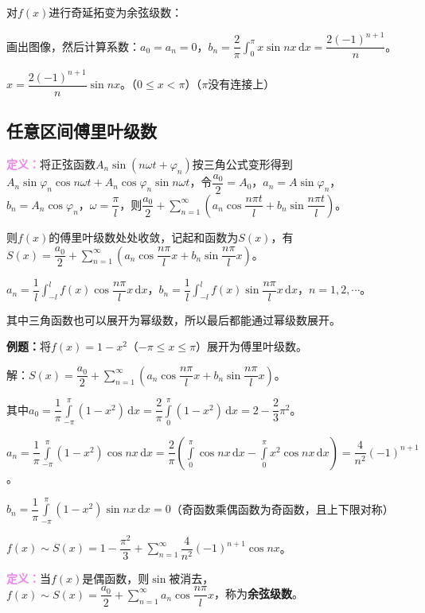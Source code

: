 对$f(x)$进行奇延拓变为余弦级数：

画出图像，然后计算系数：$a_0=a_n=0$，$b_n=\dfrac{2}{\pi}\int_0^\pi x\sin nx\,\textrm{d}x=\dfrac{2(-1)^{n+1}}{n}$。

$x=\dfrac{2(-1)^{n+1}}{n}\sin nx$。（$0\leqslant x<\pi$）（$\pi$没有连接上）

\subsection{任意区间傅里叶级数}

\textcolor{violet}{\textbf{定义：}}将正弦函数$A_n\sin(n\omega t+\varphi_n)$按三角公式变形得到$A_n\sin\varphi_n\cos n\omega t+A_n\cos\varphi_n\sin n\omega t$，令$\dfrac{a_0}{2}=A_0$，$a_n=A\sin\varphi_n$，$b_n=A_n\cos\varphi_n$，$\omega=\dfrac{\pi}{l}$，则$\dfrac{a_0}{2}+\sum\limits_{n=1}^\infty\left(a_n\cos\dfrac{n\pi t}{l}+b_n\sin\dfrac{n\pi t}{l}\right)$。

则$f(x)$的傅里叶级数处处收敛，记起和函数为$S(x)$，有$S(x)=\dfrac{a_0}{2}+\sum\limits_{n=1}^\infty\left(a_n\cos\dfrac{n\pi}{l}x+b_n\sin\dfrac{n\pi}{l}x\right)$。

$\displaystyle{a_n=\dfrac{1}{l}\int_{-l}^lf(x)\cos\dfrac{n\pi}{l}x\,\textrm{d}x}$，$\displaystyle{b_n=\dfrac{1}{l}\int_{-l}^lf(x)\sin\dfrac{n\pi}{l}x\,\textrm{d}x}$，$n=1,2,\cdots$。

其中三角函数也可以展开为幂级数，所以最后都能通过幂级数展开。

\textbf{例题：}将$f(x)=1-x^2$（$-\pi\leqslant x\leqslant\pi$）展开为傅里叶级数。

解：$S(x)=\dfrac{a_0}{2}+\sum\limits_{n=1}^\infty\left(a_n\cos\dfrac{n\pi}{l}x+b_n\sin\dfrac{n\pi}{l}x\right)$。

其中$a_0=\dfrac{1}{\pi}\int\limits_{-\pi}^\pi(1-x^2)\,\textrm{d}x=\dfrac{2}{\pi}\int\limits_0^\pi(1-x^2)\,\textrm{d}x=2-\dfrac{2}{3}\pi^2$。

$a_n=\dfrac{1}{\pi}\int\limits_{-\pi}^\pi(1-x^2)\cos nx\,\textrm{d}x=\dfrac{2}{\pi}(\int\limits_0^\pi\cos nx\,\textrm{d}x-\int\limits_0^\pi x^2\cos nx\,\textrm{d}x)=\dfrac{4}{n^2}(-1)^{n+1}$。

$b_n=\dfrac{1}{\pi}\int\limits_{-\pi}^\pi(1-x^2)\sin nx\,\textrm{d}x=0$（奇函数乘偶函数为奇函数，且上下限对称）

$f(x)\sim S(x)=1-\dfrac{\pi^2}{3}+\sum\limits_{n=1}^\infty\dfrac{4}{n^2}(-1)^{n+1}\cos nx$。

\textcolor{violet}{\textbf{定义：}}当$f(x)$是偶函数，则$\sin$被消去，$f(x)\sim S(x)=\dfrac{a_0}{2}+\sum\limits_{n=1}^\infty a_n\cos\dfrac{n\pi}{l}x$，称为\textbf{余弦级数}。

